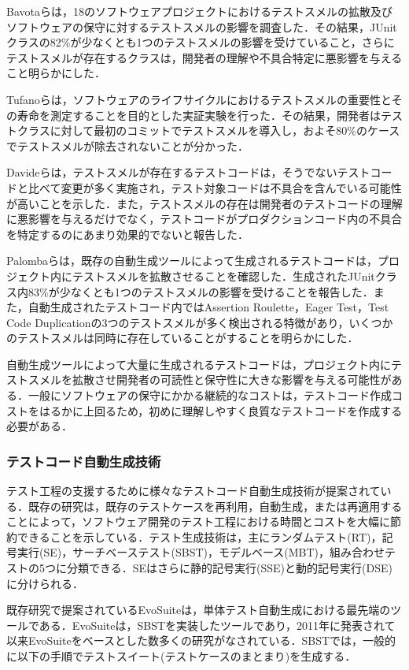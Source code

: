 \documentclass[12pt]{jarticle} %
\begin{document}
\newpage
Bavotaら\cite{Bavota}は，18のソフトウェアプロジェクトにおけるテストスメルの拡散及びソフトウェアの保守に対するテストスメルの影響を調査した．その結果，JUnitクラスの82\%が少なくとも1つのテストスメルの影響を受けていること，さらにテストスメルが存在するクラスは，開発者の理解や不具合特定に悪影響を与えること明らかにした．

Tufanoら\cite{Tufano}は，ソフトウェアのライフサイクルにおけるテストスメルの重要性とその寿命を測定することを目的とした実証実験を行った．その結果，開発者はテストクラスに対して最初のコミットでテストスメルを導入し，およそ80\%のケースでテストスメルが除去されないことが分かった．

Davideら\cite{Davide}は，テストスメルが存在するテストコードは，そうでないテストコードと比べて変更が多く実施され，テスト対象コードは不具合を含んでいる可能性が高いことを示した．また，テストスメルの存在は開発者のテストコードの理解に悪影響を与えるだけでなく，テストコードがプロダクションコード内の不具合を特定するのにあまり効果的でないと報告した．

Palombaら\cite{Fabio2016}は，既存の自動生成ツールによって生成されるテストコードは，プロジェクト内にテストスメルを拡散させることを確認した．生成されたJUnitクラス内83\%が少なくとも1つのテストスメルの影響を受けることを報告した．また，自動生成されたテストコード内ではAssertion Roulette，Eager Test，Test Code Duplicationの3つのテストスメルが多く検出される特徴があり，いくつかのテストスメルは同時に存在していることがすることを明らかにした．

自動生成ツールによって大量に生成されるテストコードは，プロジェクト内にテストスメルを拡散させ開発者の可読性と保守性に大きな影響を与える可能性がある．一般にソフトウェアの保守にかかる継続的なコストは，テストコード作成コストをはるかに上回るため，初めに理解しやすく良質なテストコードを作成する必要がある．

\subsubsection{テストコード自動生成技術}
テスト工程の支援するために様々なテストコード自動生成技術が提案されている．既存の研究\cite{Machado2010}は，既存のテストケースを再利用，自動生成，または再適用することによって，ソフトウェア開発のテスト工程における時間とコストを大幅に節約できることを示している．テスト生成技術は，主にランダムテスト(RT)，記号実行(SE)，サーチベーステスト(SBST)，モデルベース(MBT)，組み合わせテストの5つに分類できる．SEはさらに静的記号実行(SSE)と動的記号実行(DSE)に分けられる．

既存研究で提案されているEvoSuite\cite{EvoSuite}は，単体テスト自動生成における最先端のツールである．EvoSuiteは，SBSTを実装したツールであり，2011年に発表されて以来EvoSuiteをベースとした数多くの研究がなされている．SBSTでは，一般的に以下の手順でテストスイート(テストケースのまとまり)を生成する．
\end{document}

